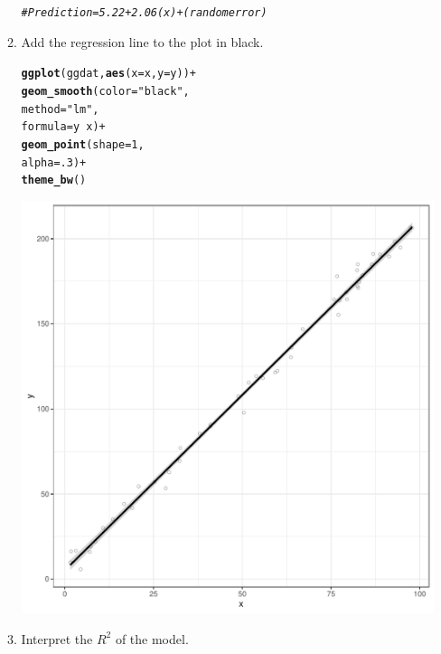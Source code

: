 \documentclass{article}\usepackage[]{graphicx}\usepackage[]{color}
\makeatletter
\def\maxwidth{ %
  \ifdim\Gin@nat@width>\linewidth
    \linewidth
  \else
    \Gin@nat@width
  \fi
}
\newcommand{\hlnum}[1]{\textcolor[rgb]{0.686,0.059,0.569}{#1}}%
\newcommand{\hlstr}[1]{\textcolor[rgb]{0.192,0.494,0.8}{#1}}%
\newcommand{\hlcom}[1]{\textcolor[rgb]{0.678,0.584,0.686}{\textit{#1}}}%
\newcommand{\hlopt}[1]{\textcolor[rgb]{0,0,0}{#1}}%
\newcommand{\hlstd}[1]{\textcolor[rgb]{0.345,0.345,0.345}{#1}}%
\newcommand{\hlkwc}[1]{\textcolor[rgb]{0.333,0.667,0.333}{#1}}%
\newcommand{\hlkwd}[1]{\textcolor[rgb]{0.737,0.353,0.396}{\textbf{#1}}}%
\newenvironment{kframe}{%
 \def\at@end@of@kframe{}%
 \ifinner\ifhmode%
  \def\at@end@of@kframe{\end{minipage}}%
  \begin{minipage}{\columnwidth}%
 \fi\fi%
 \def\FrameCommand##1{\hskip\@totalleftmargin \hskip-\fboxsep
 \colorbox{shadecolor}{##1}\hskip-\fboxsep
     \hskip-\linewidth \hskip-\@totalleftmargin \hskip\columnwidth}%
 \MakeFramed {\advance\hsize-\width
   \@totalleftmargin\z@ \linewidth\hsize
   \@setminipage}}%
 {\par\unskip\endMakeFramed%
 \at@end@of@kframe}
\newenvironment{knitrout}{}{} %
\makeatother
\begin{document}
\begin{enumerate}
\begin{enumerate}
\begin{knitrout}
\begin{kframe}
\begin{alltt}
\hlcom{#Prediction = 5.22+2.06(x) + (random error)}
\end{alltt}
\end{kframe}
\end{knitrout}
    \item Add the regression line to the plot in black.
\begin{knitrout}
\color{fgcolor}\begin{kframe}
\begin{alltt}
\hlkwd{ggplot}\hlstd{(ggdat,} \hlkwd{aes}\hlstd{(}\hlkwc{x}\hlstd{=x,} \hlkwc{y}\hlstd{=y))}\hlopt{+}
  \hlkwd{geom_smooth}\hlstd{(}\hlkwc{color}\hlstd{=}\hlstr{"black"}\hlstd{,}
              \hlkwc{method}\hlstd{=}\hlstr{"lm"}\hlstd{,}
              \hlkwc{formula}\hlstd{=y}\hlopt{~}\hlstd{x)}\hlopt{+}
  \hlkwd{geom_point}\hlstd{(}\hlkwc{shape}\hlstd{=}\hlnum{1}\hlstd{,}
             \hlkwc{alpha}\hlstd{=}\hlnum{.3}\hlstd{)}\hlopt{+}
  \hlkwd{theme_bw}\hlstd{()}
\end{alltt}
\end{kframe}
\includegraphics[width=\maxwidth]{figure/unnamed-chunk-23-1} 
\end{knitrout}
    \item Interpret the $R^2$ of the model.
\begin{knitrout}
\color{fgcolor}\begin{kframe}

\end{kframe}
\end{knitrout}
\end{enumerate}
\end{enumerate}
\end{document}
